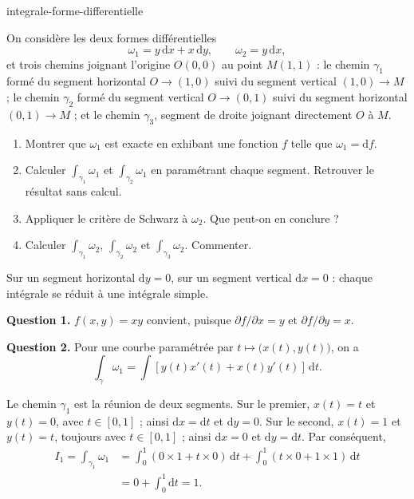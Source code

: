 
\begin{exo}{integrale-forme-differentielle}

On considère les deux formes différentielles
\[
\omega_1 = y\,\mathrm{d}x + x\,\mathrm{d}y,
\qquad
\omega_2 = y\,\mathrm{d}x,
\]
et trois chemins joignant l'origine $O(0,0)$ au point $M(1,1)$ : le chemin
$\gamma_1$ formé du segment horizontal $O\to(1,0)$ suivi du segment vertical
$(1,0)\to M$ ; le chemin $\gamma_2$ formé du segment vertical $O\to(0,1)$ suivi
du segment horizontal $(0,1)\to M$ ; et le chemin $\gamma_3$, segment de droite
joignant directement $O$ à $M$.

\begin{enumerate}
\item Montrer que $\omega_1$ est exacte en exhibant une fonction $f$ telle que $\omega_1 = \mathrm{d}f$.
\item Calculer $\int_{\gamma_1}\omega_1$ et $\int_{\gamma_2}\omega_1$ en paramétrant chaque segment. Retrouver le résultat sans calcul.
\item Appliquer le critère de Schwarz à $\omega_2$. Que peut-on en conclure ?
\item Calculer $\int_{\gamma_1}\omega_2$, $\int_{\gamma_2}\omega_2$ et $\int_{\gamma_3}\omega_2$. Commenter.
\end{enumerate}

\begin{indication}
Sur un segment horizontal $\mathrm{d}y = 0$, sur un segment vertical
$\mathrm{d}x = 0$ : chaque intégrale se réduit à une intégrale simple.
\end{indication}

\begin{solution}
\textbf{Question 1.} $f(x,y) = xy$ convient, puisque $\partial f/\partial x = y$ et $\partial f/\partial y = x$.

\textbf{Question 2.} Pour une courbe paramétrée par
$t\mapsto\bigl(x(t),y(t)\bigr)$, on a
\[
\int_\gamma\omega_1
= \int \left[y(t)x'(t)+x(t)y'(t)\right]\,\mathrm{d}t.
\]

Le chemin $\gamma_1$ est la réunion de deux segments. Sur le premier,
$x(t)=t$ et $y(t)=0$, avec $t\in[0,1]$ ; ainsi $\mathrm{d}x=\mathrm{d}t$
et $\mathrm{d}y=0$. Sur le second, $x(t)=1$ et $y(t)=t$, toujours avec
$t\in[0,1]$ ; ainsi $\mathrm{d}x=0$ et $\mathrm{d}y=\mathrm{d}t$. Par
conséquent,
\[
\begin{aligned}
I_1
= \int_{\gamma_1}\omega_1
&= \int_0^1\left(0\times 1+t\times 0\right)\,\mathrm{d}t
 + \int_0^1\left(t\times 0+1\times 1\right)\,\mathrm{d}t \\
&= 0+\int_0^1\mathrm{d}t = 1.
\end{aligned}
\]


\end{solution}
\end{exo}
